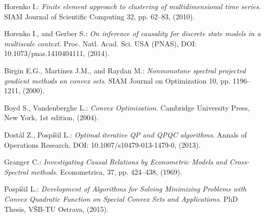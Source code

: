 \documentclass[a4paper,10pt]{article}
\begin{document}
\begin{thebibliography}{}

Horenko I.:
{\em Finite element approach to clustering of multidimensional time series}.
SIAM Journal of Scientific Computing 32, pp. 62--83, (2010).

Horenko I., and Gerber S.:
{\em On inference of causality for discrete state models in a multiscale context}.
Proc. Natl. Acad. Sci. USA (PNAS), DOI: 10.1073/pnas.1410404111, (2014).

  Birgin E.G., Mart\'{i}nez J.M., and Raydan M.:
  {\em Nonmonotone spectral projected gradient methods on convex sets}.
  SIAM Journal on Optimization 10, pp. 1196--1211, (2000).

  Boyd S., Vandenberghe L.:
  {\em Convex Optimization}. 
  Cambridge University Press, New York, 1st edition, (2004).

 Dost\'{a}l Z., Posp\'{i}\v{s}il L.:
 {\em Optimal iterative QP and QPQC algorithms}.
 Annals of Operations Research, DOI: 10.1007/s10479-013-1479-0, (2013).  

Granger C.:
{\em Investigating Causal Relations by Econometric Models and Cross-Spectral methods}.
Econometrica, 37, pp. 424--438, (1969).


 Posp\'{i}\v{s}il L.:
 {\em Development of Algorithms for Solving Minimizing Problems with Convex Quadratic Function on Special Convex Sets and Applications}.
 PhD Thesis, V\v{S}B-TU Ostrava, (2015).


  

   
\end{thebibliography}
\end{document}
